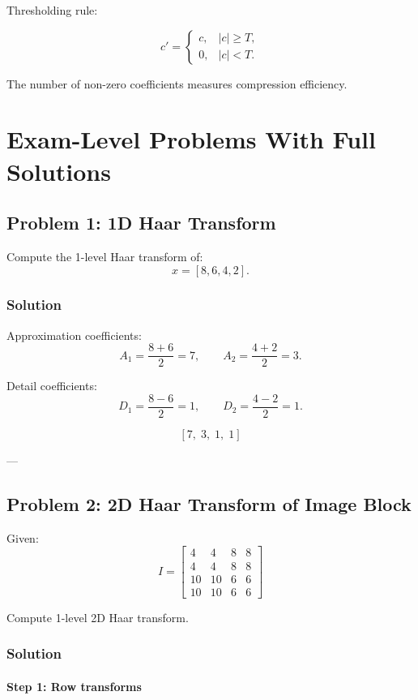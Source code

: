 \documentclass{AnantDocumentation}
\begin{document}
Thresholding rule:

\[
c' =
\begin{cases}
c, & |c| \ge T, \\
0, & |c| < T.
\end{cases}
\]

The number of non-zero coefficients measures compression efficiency.

\newpage
\section*{Exam-Level Problems With Full Solutions}

\subsection*{Problem 1: 1D Haar Transform}

Compute the 1-level Haar transform of:
\[
x = [8, 6, 4, 2].
\]

\subsubsection*{Solution}

Approximation coefficients:
\[
A_1 = \frac{8+6}{2} = 7,\qquad A_2 = \frac{4+2}{2} = 3.
\]

Detail coefficients:
\[
D_1 = \frac{8-6}{2} = 1,\qquad D_2 = \frac{4-2}{2} = 1.
\]

\[
\boxed{
[7,\; 3,\; 1,\; 1]
}
\]

---

\subsection*{Problem 2: 2D Haar Transform of Image Block}

Given:
\[
I =
\begin{bmatrix}
4 & 4 & 8 & 8 \\
4 & 4 & 8 & 8 \\
10 & 10 & 6 & 6 \\
10 & 10 & 6 & 6
\end{bmatrix}
\]

Compute 1-level 2D Haar transform.

\subsubsection*{Solution}

\paragraph{Step 1: Row transforms}
\end{document}
